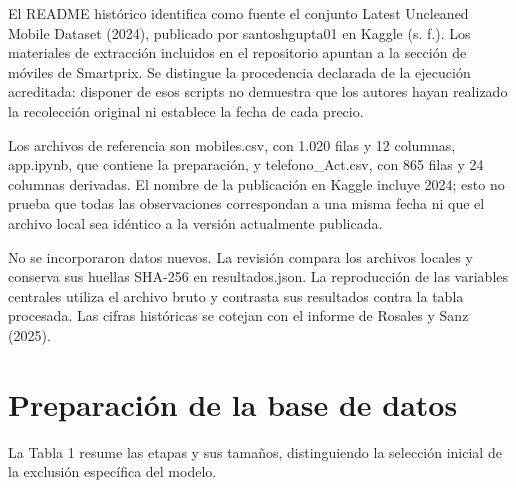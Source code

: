 \documentclass[12pt,letterpaper]{article}
\begin{document}
El README histórico identifica como fuente el conjunto Latest Uncleaned Mobile Dataset (2024), publicado por santoshgupta01 en Kaggle (s. f.). Los materiales de extracción incluidos en el repositorio apuntan a la sección de móviles de Smartprix. Se distingue la procedencia declarada de la ejecución acreditada: disponer de esos scripts no demuestra que los autores hayan realizado la recolección original ni establece la fecha de cada precio.

Los archivos de referencia son mobiles.csv, con 1.020 filas y 12 columnas, app.ipynb, que contiene la preparación, y telefono\_Act.csv, con 865 filas y 24 columnas derivadas. El nombre de la publicación en Kaggle incluye 2024; esto no prueba que todas las observaciones correspondan a una misma fecha ni que el archivo local sea idéntico a la versión actualmente publicada.

No se incorporaron datos nuevos. La revisión compara los archivos locales y conserva sus huellas SHA-256 en resultados.json. La reproducción de las variables centrales utiliza el archivo bruto y contrasta sus resultados contra la tabla procesada. Las cifras históricas se cotejan con el informe de Rosales y Sanz (2025).

\clearpage
\section*{Preparación de la base de datos}
La Tabla 1 resume las etapas y sus tamaños, distinguiendo la selección inicial de la exclusión específica del modelo.
\end{document}
